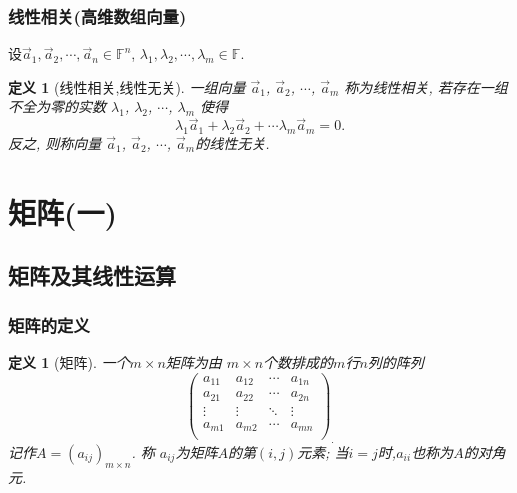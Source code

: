 \documentclass{article}
\newtheorem{definition}[theorem]{定义}
\renewcommand{\blue }[1]{{\textcolor[rgb]{0,0,1}{#1}}}
\begin{document}
\subsubsection{线性相关(高维数组向量)}
设$\vec{a}_1,\vec{a}_2,\cdots,\vec{a}_n\in \mathbb F^n$,  $\lambda_1,\lambda_2,\cdots,\lambda_m\in \mathbb F$.
\begin{center}
\fbox{\blue{$\lambda_1\vec{a}_1 + \lambda_2\vec{a}_2 + \cdots \lambda_m\vec{a}_m$} \qquad $\longleftarrow$ \blue{线性组合} }
\end{center}
\begin{definition}[线性相关,线性无关]
一组向量 $\vec{a}_1$, $\vec{a}_2$, $\cdots$, $\vec{a}_m$ 称为\blue{线性相关}, 若存在一组不全为零的实数 $\lambda_1$, $\lambda_2$, $\cdots$, $\lambda_m$ 使得
\[\lambda_1\vec{a}_1 + \lambda_2\vec{a}_2 + \cdots \lambda_m\vec{a}_m=0.\]
反之,	则称向量 $\vec{a}_1$, $\vec{a}_2$, $\cdots$, $\vec{a}_m$的\blue{线性无关}.
\end{definition}

\newpage




\section{矩阵(一)}


\subsection{矩阵及其线性运算}

\subsubsection{矩阵的定义}
\begin{definition}[矩阵] 一个\blue{$m\times n$矩阵}为由 $m\times n$个数排成的$m$行$n$列的阵列
\[\left(
\begin{array}{cccc}
a_{11} & a_{12} & \cdots & a_{1 n}\\
a_{21} & a_{22} & \cdots & a_{2 n}\\
\vdots & \vdots & \ddots & \vdots\\
a_{m 1} & a_{m 2} & \cdots & a_{mn}\\
\end{array}
\right)_.\]
记作$A=(a_{ij})_{m\times n}$.  称 $a_{ij}$为矩阵$A$的\blue{第$(i,j)$元素};  当$i=j$时,$a_{ii}$也称为$A$的\blue{对角元}.
\end{definition}
\end{document}
